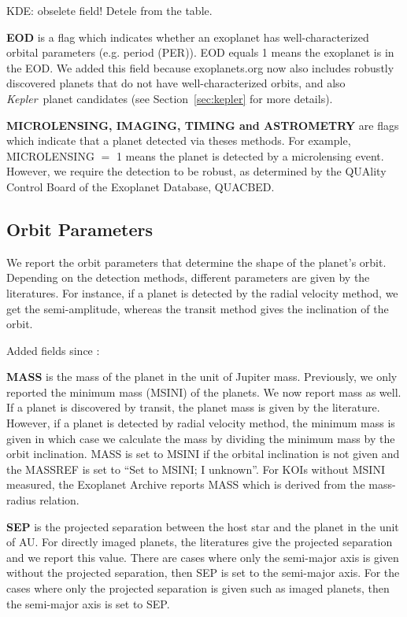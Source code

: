 \documentclass[11pt,preprint]{aastex}
\def\kepler{\textit{Kepler}}
\begin{document}
\begin{CJK*}{UTF8}{gbsn}
KDE: obselete field! Detele from the table.

{\bf EOD} is a flag which indicates whether an exoplanet has well-characterized orbital parameters (e.g. period (PER)). EOD equals 1 means the exoplanet is in the EOD. We added this field because exoplanets.org now also includes robustly discovered planets that do not have well-characterized orbits, and also \kepler\ planet candidates (see Section~\ref{sec:kepler} for more details).


{\bf MICROLENSING, IMAGING, TIMING and ASTROMETRY} are flags which indicate that a planet detected via theses methods. For example, MICROLENSING $=$ 1 means the planet is detected by a microlensing event. However, we require the detection to be robust, as determined by the QUAlity Control Board of the Exoplanet Database, QUACBED. 


\subsection{Orbit Parameters}
We report the orbit parameters that determine the shape of the planet's orbit. Depending on the detection methods, different parameters are given by the literatures. For instance, if a planet is detected by the radial velocity method, we get the semi-amplitude, whereas the transit method gives the inclination of the orbit. 

Added fields since \cite{Wright2011}:


{\bf MASS} is the mass of the planet in the unit of Jupiter mass. Previously, we only reported the minimum mass (MSINI) of the planets. We now report mass as well. If a planet is discovered by transit, the planet mass is given by the literature. However, if a planet is detected by radial velocity
method, the minimum mass is given in which case we calculate the mass
by dividing the minimum mass by the orbit inclination. MASS is set to
MSINI if the orbital inclination is not given and the MASSREF is set
to ``Set to MSINI; I unknown''. For KOIs without MSINI measured, the Exoplanet Archive reports MASS which is derived from the mass-radius relation. 


{\bf SEP} is the projected separation between the host star and the planet in the unit of AU. For directly imaged planets, the literatures give the projected separation and we report this value. There are cases where only the semi-major axis is given without the projected separation, then SEP is set to the semi-major axis. For the cases where only the projected separation is given such as imaged planets, then the semi-major axis is set to SEP. 


\end{CJK*}
\end{document}

